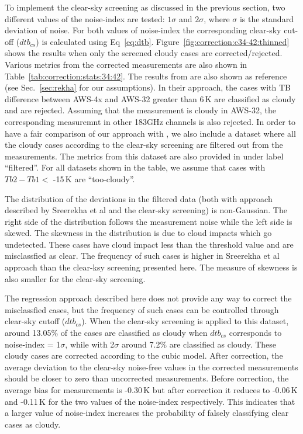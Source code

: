 \documentclass[12pt]{article}
\begin{document}
To implement the clear-sky screening as discussed in the previous section, two
different values of the noise-index are tested: $1\sigma$ and $2\sigma$, where
$\sigma$ is the standard deviation of noise. For both values of noise-index the
corresponding clear-sky cut-off ($dtb_{cs}$) is calculated using
Eq~\ref{eq:dtb}. Figure~\ref{fig:correction:c34-42:thinned} shows the results
when only the screened cloudy cases are corrected/rejected. Various metrics
from the corrected measurements are also shown in
Table~\ref{tab:correction:stats:34:42}. The results from
\cite{rekha2012potential} are also shown as reference (see Sec.~\ref{sec:rekha}
for our assumptions). In their approach, the cases with TB difference between
AWS-4x and AWS-32 greater than 6\,K are classified as cloudy and are rejected.
Assuming that the measurement is cloudy in AWS-32, the corresponding measuremnt
in other 183GHz channels is also rejected. In order to have a fair comparison
of our approach with \cite{rekha2012potential}, we also include a dataset where
all the cloudy cases according to the clear-sky screening are filtered out from
the measurements. The metrics from this dataset are also provided in under
label ``filtered''. For all datasets shown in the table, we assume that cases
with $Tb2-Tb1 < $ -15\,K are ``too-cloudy''.

The distribution of the deviations in the filtered data (both with approach
described by Sreerekha et al and the clear-sky screening) is non-Gaussian. The
right side of the distribution follows the measurement noise while the left
side is skewed. The skewness in the distribution is due to cloud impacts which
go undetected. These cases have cloud impact less than the threshold value and
are misclassfied as clear. The frequency of such cases is higher in Sreerekha
et al approach than the clear-ksy screening presented here. The measure of
skewness is also smaller for the clear-sky screening. 

The regression approach described here does not provide any way to correct the
misclassfied cases, but the frequency of such cases can be controlled through
clear-sky cutoff ($dtb_{cs}$). When the clear-sky screening is applied to this
dataset, around 13.05\% of the cases are classified as cloudy when $dtb_{cs}$
corresponds to noise-index = 1$\sigma$, while with 2$\sigma$ around 7.2\% are
classified as cloudy. These cloudy cases are corrected according to the cubic
model. After correction, the average deviation to the clear-sky noise-free
values in the corrected measurements should be closer to zero than uncorrected
measurements. Before correction, the average bias for measurements is -0.30\,K
but after correction it reduces to -0.06\,K and -0.11\,K for the two values of
the noise-index respectively. This indicates that a larger value of noise-index
increases the probability of falsely classifying clear cases as cloudy.
%
\end{document}
